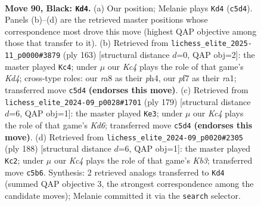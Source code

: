 \documentclass[11pt]{article}
\begin{document}
\clearpage

\begin{figure}[p]\centering
\begin{subfigure}{0.46\textwidth}\centering
\resizebox{\linewidth}{!}{%
\newchessgame
\chessboard[
  setfen={R7/5P1P/8/2k2B2/8/8/8/7K b - - 0 90},
  showmover=false,
  pgfstyle=straightmove, color=movearrow, markmove={c5-d4}
]}
\caption{}
\end{subfigure}\hfill
\begin{subfigure}{0.46\textwidth}\centering
\resizebox{\linewidth}{!}{%
\newchessgame
\chessboard[
  setfen={5B2/8/7P/3k4/7P/8/5K2/R7 b - - 0 82},
  showmover=false,
  pgfstyle=straightmove, color=movearrow, markmove={d5-c4}
]}
\caption{}
\end{subfigure}
\\[4pt]
\begin{subfigure}{0.46\textwidth}\centering
\resizebox{\linewidth}{!}{%
\newchessgame
\chessboard[
  setfen={8/3B4/8/4K3/6P1/3k4/8/8 b - - 4 90},
  showmover=false,
  pgfstyle=straightmove, color=movearrow, markmove={d3-e3}
]}
\caption{}
\end{subfigure}\hfill
\begin{subfigure}{0.46\textwidth}\centering
\resizebox{\linewidth}{!}{%
\newchessgame
\chessboard[
  setfen={8/8/8/3k4/5b2/1K4p1/8/8 w - - 0 95},
  showmover=false,
  pgfstyle=straightmove, color=movearrow, markmove={b3-c2}
]}
\caption{}
\end{subfigure}
\caption{\textbf{Move 90, Black: \texttt{Kd4}.} (a) Our position; Melanie plays \texttt{Kd4} (\texttt{c5d4}). Panels (b)--(d) are the retrieved master positions whose correspondence most drove this move (highest QAP objective among those that transfer to it). (b) Retrieved from \texttt{lichess\_elite\_2025-11\_p0000\#3879} (ply 163) [structural distance $d$=0, QAP obj=2]: the master played \texttt{Kc4}; under $\mu$ our \emph{Kc4} plays the role of that game's \emph{Kd4}; cross-type roles: our \emph{r}a8 as their \emph{p}h4, our \emph{p}f7 as their \emph{r}a1; transferred move \texttt{c5d4} \textbf{(endorses this move)}. (c) Retrieved from \texttt{lichess\_elite\_2024-09\_p0028\#1701} (ply 179) [structural distance $d$=6, QAP obj=1]: the master played \texttt{Ke3}; under $\mu$ our \emph{Kc4} plays the role of that game's \emph{Kd6}; transferred move \texttt{c5d4} \textbf{(endorses this move)}. (d) Retrieved from \texttt{lichess\_elite\_2024-09\_p0020\#2305} (ply 188) [structural distance $d$=6, QAP obj=1]: the master played \texttt{Kc2}; under $\mu$ our \emph{Kc4} plays the role of that game's \emph{Kb3}; transferred move \texttt{c5b6}. Synthesis: 2 retrieved analogs transferred to \texttt{Kd4} (summed QAP objective 3, the strongest correspondence among the candidate moves); Melanie committed it via the \texttt{search} selector.}
\label{fig:thought-m179}
\end{figure}
\end{document}
